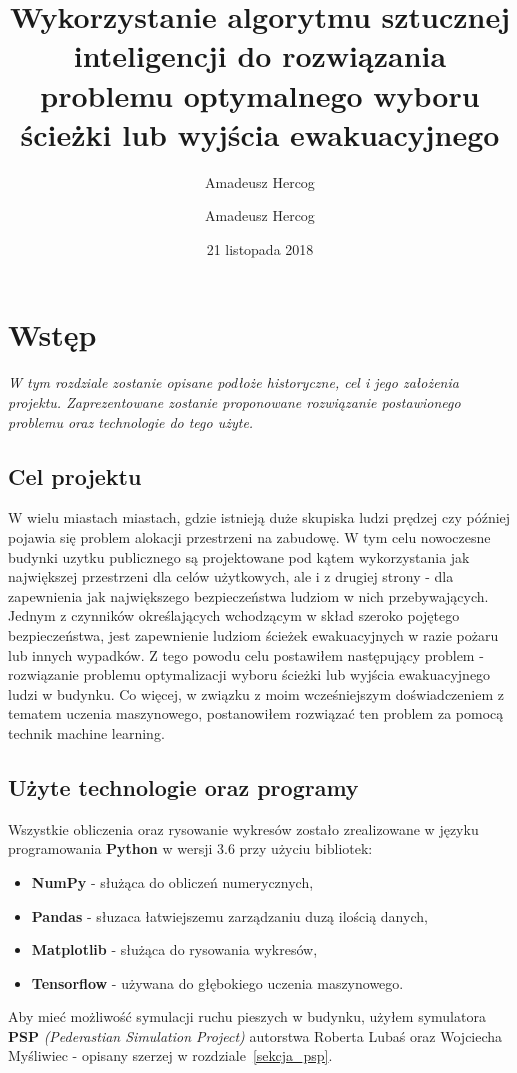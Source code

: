 \documentclass[12pt]{aghdpl}
\author{Amadeusz Hercog}
\title{Wykorzystanie algorytmu sztucznej inteligencji do rozwiązania problemu optymalnego wyboru ścieżki lub wyjścia ewakuacyjnego}
\author{Amadeusz Hercog}
\date{21 listopada 2018}
\begin{document}
	\titlepages
	
	\chapter{Wstęp}
	\textit{W tym rozdziale zostanie opisane podłoże historyczne, cel i jego założenia projektu. Zaprezentowane zostanie proponowane rozwiązanie postawionego problemu oraz technologie do tego użyte.}
	
		\section{Cel projektu}	
		W wielu miastach miastach, gdzie istnieją duże skupiska ludzi prędzej czy później pojawia się problem alokacji przestrzeni na zabudowę. W tym celu nowoczesne budynki uzytku publicznego są projektowane pod kątem wykorzystania jak największej przestrzeni dla celów użytkowych, ale i z drugiej strony - dla zapewnienia jak największego bezpieczeństwa ludziom w nich przebywających. Jednym z czynników określających wchodzącym w skład szeroko pojętego bezpieczeństwa, jest zapewnienie ludziom ścieżek ewakuacyjnych w razie pożaru lub innych wypadków. Z tego powodu celu postawiłem następujący problem - rozwiązanie problemu optymalizacji wyboru ścieżki lub wyjścia ewakuacyjnego ludzi w budynku. Co więcej, w związku z moim wcześniejszym doświadczeniem z tematem uczenia maszynowego, postanowiłem rozwiązać ten problem za pomocą technik machine learning.
		
		\section{Użyte technologie oraz programy}
		Wszystkie obliczenia oraz rysowanie wykresów zostało zrealizowane w języku programowania \textbf{Python} w wersji 3.6 przy użyciu bibliotek:
		\begin{itemize}
			\item \textbf{NumPy} - służąca do obliczeń numerycznych,
			\item \textbf{Pandas} - słuzaca łatwiejszemu zarządzaniu duzą ilością danych,
			\item \textbf{Matplotlib} - służąca do rysowania wykresów,
			\item \textbf{Tensorflow} - używana do głębokiego uczenia maszynowego.
		\end{itemize}
		
		Aby mieć możliwość symulacji ruchu pieszych w budynku, użyłem symulatora \textbf{PSP} \textit{(Pederastian Simulation Project)} autorstwa Roberta Lubaś oraz Wojciecha Myśliwiec - opisany szerzej w rozdziale~\ref{sekcja_psp}.
		
\end{document}
